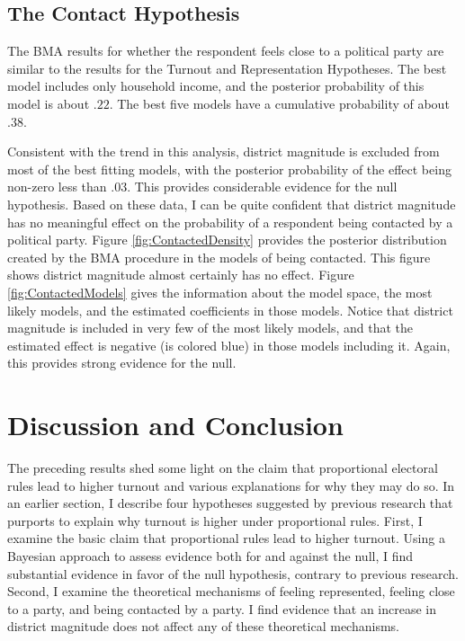 \documentclass[12pt]{article}
\begin{document}
\subsection*{The Contact Hypothesis}

The BMA results for whether the respondent feels close to a political party are similar to the results for the Turnout and Representation Hypotheses. The best model includes only household income, and the posterior probability of this model is about $.22$. The best five models have a cumulative probability of about $.38$.

Consistent with the trend in this analysis, district magnitude is excluded from most of the best fitting models, with the posterior probability of the effect being non-zero less than $.03$. This provides considerable evidence for the null hypothesis. Based on these data, I can be quite confident that district magnitude has no meaningful effect on the probability of a respondent being contacted by a political party. Figure \ref{fig:ContactedDensity} provides the posterior distribution created by the BMA procedure in the models of being contacted. This figure shows district magnitude almost certainly has no effect. Figure \ref{fig:ContactedModels} gives the information about the model space, the most likely models, and the estimated coefficients in those models. Notice that district magnitude is included in very few of the most likely models, and that the estimated effect is negative (is colored blue) in those models including it. Again, this provides strong evidence for the null. 

\section*{Discussion and Conclusion}

The preceding results shed some light on the claim that proportional electoral rules lead to higher turnout and various explanations for why they may do so. In an earlier section, I describe four hypotheses suggested by previous research that purports to explain why turnout is higher under proportional rules. First, I examine the basic claim that proportional rules lead to higher turnout. Using a Bayesian approach to assess evidence both for and against the null, I find substantial evidence in favor of the null hypothesis, contrary to previous research. Second, I examine the theoretical mechanisms of feeling represented, feeling close to a party, and being contacted by a party. I find evidence that an increase in district magnitude does not affect any of these theoretical mechanisms.
\end{document}
